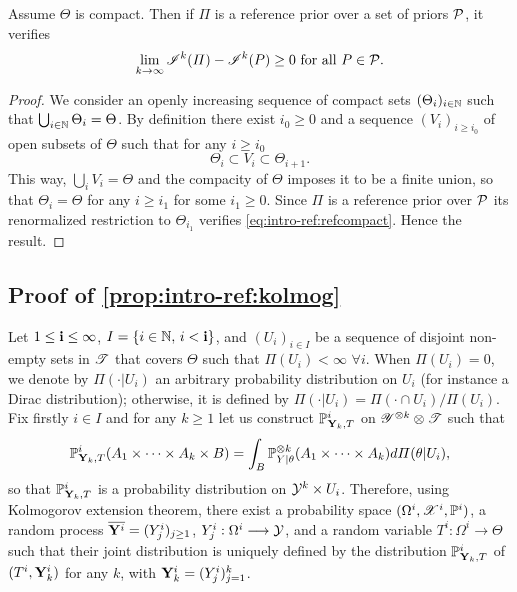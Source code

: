 \begin{prop}
    Assume $\Theta$ is compact. Then if $\varPi$ is a reference prior over a set of priors $\mathcal{P}$, it verifies
        \begin{equation}\label{eq:intro-ref:refcompact}
            \lim_{k\rightarrow\infty} \mathscr{I}^k(\varPi)-\mathscr{I}^k(P) \geq0\text{\ for all\ } P\in\mathcal{P}.
        \end{equation}
\end{prop}


\begin{proof} 
We consider an openly increasing sequence of compact sets $(\Theta_i)_{i\in\mathbb{N}}$ such that $\bigcup_{i\in\mathbb{N}}\Theta_i = \Theta$.
By definition there exist $i_0\geq0$ and a sequence $(V_i)_{i\geq i_0}$ of open subsets of $\Theta$  such that for any $i\geq i_0$
    \begin{equation}
        \Theta_i\subset V_i\subset \Theta_{i+1}.
    \end{equation}
This way, $\bigcup_iV_i=\Theta$ and the compacity of $\Theta$ imposes it to  be a finite union, so that $\Theta_i=\Theta$ for any $i\geq i_1$ for some $i_1\geq0$.
Since $\varPi$ is a reference prior over $\mathcal{P}$ its renormalized restriction to $\Theta_{i_1}$ verifies \cref{eq:intro-ref:refcompact}. Hence the result.
\end{proof}


\subsection{Proof of \cref{prop:intro-ref:kolmog}}\label{sec:intro-ref:proof}



Let $1\leq\mathbf{i}\leq\infty$, $I=\{i\in\mathbb{N},\,i<\mathbf{i}\}$, and $(U_i)_{i\in I}$ be a sequence of disjoint non-empty sets in $\mathscr{T}$ that covers $\Theta$ such that $\varPi(U_i)<\infty$ $\forall i$.
When $\varPi(U_i)=0$, we denote by $\varPi(\cdot|U_i)$ an arbitrary probability distribution on $U_i$ (for instance a Dirac distribution); otherwise, it is defined by $\varPi(\cdot|U_i)=\varPi(\cdot\cap U_i)/\varPi(U_i)$.
    Fix firstly $i\in I$ and for any $k\geq1$ let us construct $\mathbb{P}_{\mathbf{Y}_k,T}^i$ on $\mathscr{Y}^{\otimes k}\otimes\mathscr{T}$ such that
        \begin{equation}
            \mathbb{P}_{\mathbf{Y}_k,T}^i(A_1\times\dots\times A_k\times B) = \int_B \mathbb{P}_{Y|\theta}^{\otimes k}(A_1\times\dots\times A_k)d\varPi(\theta|U_i),
        \end{equation}
     so that $\mathbb{P}^i_{\mathbf{Y}_k,T}$ is a probability distribution on $\mathcal{Y}^k\times U_i$. 
    Therefore, using Kolmogorov extension theorem, there exist a probability space $(\Omega^i,\mathscr{X}^i,\mathbb{P}^i)$, a random process $\overline{\mathbf{Y}^i}=(Y^i_j)_{j\geq1}$, $Y_j^i:\Omega^i\longrightarrow\mathcal{Y}$, and a random variable $T^i:\Omega^i\to\Theta$ such that their joint distribution is uniquely defined by the distribution
    $\mathbb{P}^i_{\mathbf{Y}_k,T}$ of $(T^i,\mathbf{Y}_k^i)$ for any $k$, with $\mathbf{Y}_k^i=(Y_j^i)_{j=1}^k$.



